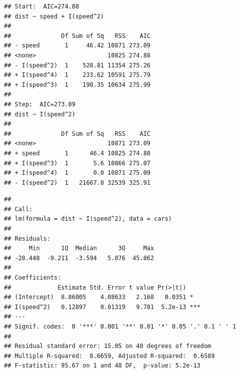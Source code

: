\documentclass[krantz2]{krantz}\usepackage{knitr}
\begin{document}
\begin{knitrout}\footnotesize
{}\color{fgcolor}\begin{kframe}
\begin{alltt}
 \hlkwb{<-}
         \hlopt{~}  \hlopt{+} \hlopt{^}\hlstd{)} \hlopt{+} \hlopt{^}\hlstd{)} \hlopt{+} \hlopt{^}\hlstd{))}
\end{alltt}
\begin{verbatim}
## Start:  AIC=274.88
## dist ~ speed + I(speed^2)
## 
##              Df Sum of Sq   RSS    AIC
## - speed       1     46.42 10871 273.09
## <none>                    10825 274.88
## - I(speed^2)  1    528.81 11354 275.26
## + I(speed^4)  1    233.62 10591 275.79
## + I(speed^3)  1    190.35 10634 275.99
## 
## Step:  AIC=273.09
## dist ~ I(speed^2)
## 
##              Df Sum of Sq   RSS    AIC
## <none>                    10871 273.09
## + speed       1      46.4 10825 274.88
## + I(speed^3)  1       5.6 10866 275.07
## + I(speed^4)  1       0.0 10871 275.09
## - I(speed^2)  1   21667.8 32539 325.91
\end{verbatim}
\begin{alltt}
\end{alltt}
\begin{verbatim}
## 
## Call:
## lm(formula = dist ~ I(speed^2), data = cars)
## 
## Residuals:
##     Min      1Q  Median      3Q     Max 
## -28.448  -9.211  -3.594   5.076  45.862 
## 
## Coefficients:
##             Estimate Std. Error t value Pr(>|t|)    
## (Intercept)  8.86005    4.08633   2.168   0.0351 *  
## I(speed^2)   0.12897    0.01319   9.781  5.2e-13 ***
## ---
## Signif. codes:  0 '***' 0.001 '**' 0.01 '*' 0.05 '.' 0.1 ' ' 1
## 
## Residual standard error: 15.05 on 48 degrees of freedom
## Multiple R-squared:  0.6659,	Adjusted R-squared:  0.6589 
## F-statistic: 95.67 on 1 and 48 DF,  p-value: 5.2e-13
\end{verbatim}
\end{kframe}
\end{knitrout}
\end{document}
